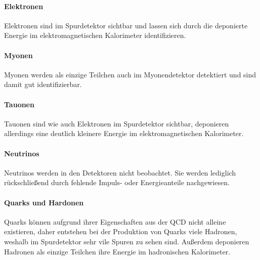 \paragraph{Elektronen}
Elektronen sind im Spurdetektor sichtbar und lassen sich durch die deponierte Energie im elektromagnetischen Kalorimeter identifizieren.
\paragraph{Myonen}
Myonen werden als einzige Teilchen auch im Myonendetektor detektiert und sind damit gut identifizierbar.
\paragraph{Tauonen}
Tauonen sind wie auch Elektronen im Spurdetektor sichtbar, deponieren allerdings eine deutlich kleinere Energie im elektromagnetischen Kalorimeter.
\paragraph{Neutrinos}
Neutrinos werden in den Detektoren nicht beobachtet. Sie werden lediglich rückschließend durch fehlende Impuls- oder Energieanteile nachgewiesen.
\paragraph{Quarks und Hardonen}
Quarks können aufgrund ihrer Eigenschaften aus der QCD nicht alleine existieren, daher entstehen bei der Produktion von Quarks viele Hadronen, weshalb im Spurdetektor sehr vile Spuren zu sehen sind. Außerdem deponieren Hadronen als einzige Teilchen ihre Energie im hadronischen Kalorimeter.